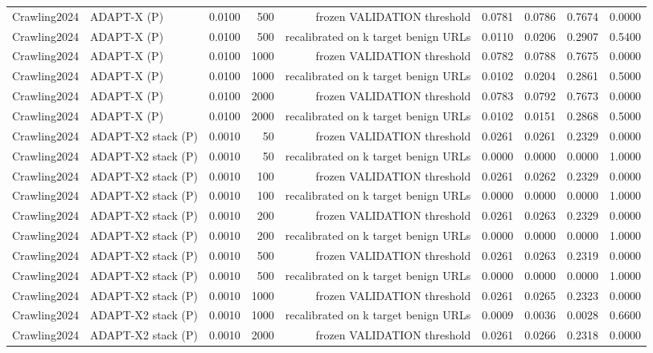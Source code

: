 \begin{table}[t]
\begin{tabular}{llrrrrrrr}
Crawling2024 & ADAPT-X (P) & 0.0100 & 500 & frozen VALIDATION threshold & 0.0781 & 0.0786 & 0.7674 & 0.0000 \\
Crawling2024 & ADAPT-X (P) & 0.0100 & 500 & recalibrated on k target benign URLs & 0.0110 & 0.0206 & 0.2907 & 0.5400 \\
Crawling2024 & ADAPT-X (P) & 0.0100 & 1000 & frozen VALIDATION threshold & 0.0782 & 0.0788 & 0.7675 & 0.0000 \\
Crawling2024 & ADAPT-X (P) & 0.0100 & 1000 & recalibrated on k target benign URLs & 0.0102 & 0.0204 & 0.2861 & 0.5000 \\
Crawling2024 & ADAPT-X (P) & 0.0100 & 2000 & frozen VALIDATION threshold & 0.0783 & 0.0792 & 0.7673 & 0.0000 \\
Crawling2024 & ADAPT-X (P) & 0.0100 & 2000 & recalibrated on k target benign URLs & 0.0102 & 0.0151 & 0.2868 & 0.5000 \\
Crawling2024 & ADAPT-X2 stack (P) & 0.0010 & 50 & frozen VALIDATION threshold & 0.0261 & 0.0261 & 0.2329 & 0.0000 \\
Crawling2024 & ADAPT-X2 stack (P) & 0.0010 & 50 & recalibrated on k target benign URLs & 0.0000 & 0.0000 & 0.0000 & 1.0000 \\
Crawling2024 & ADAPT-X2 stack (P) & 0.0010 & 100 & frozen VALIDATION threshold & 0.0261 & 0.0262 & 0.2329 & 0.0000 \\
Crawling2024 & ADAPT-X2 stack (P) & 0.0010 & 100 & recalibrated on k target benign URLs & 0.0000 & 0.0000 & 0.0000 & 1.0000 \\
Crawling2024 & ADAPT-X2 stack (P) & 0.0010 & 200 & frozen VALIDATION threshold & 0.0261 & 0.0263 & 0.2329 & 0.0000 \\
Crawling2024 & ADAPT-X2 stack (P) & 0.0010 & 200 & recalibrated on k target benign URLs & 0.0000 & 0.0000 & 0.0000 & 1.0000 \\
Crawling2024 & ADAPT-X2 stack (P) & 0.0010 & 500 & frozen VALIDATION threshold & 0.0261 & 0.0263 & 0.2319 & 0.0000 \\
Crawling2024 & ADAPT-X2 stack (P) & 0.0010 & 500 & recalibrated on k target benign URLs & 0.0000 & 0.0000 & 0.0000 & 1.0000 \\
Crawling2024 & ADAPT-X2 stack (P) & 0.0010 & 1000 & frozen VALIDATION threshold & 0.0261 & 0.0265 & 0.2323 & 0.0000 \\
Crawling2024 & ADAPT-X2 stack (P) & 0.0010 & 1000 & recalibrated on k target benign URLs & 0.0009 & 0.0036 & 0.0028 & 0.6600 \\
Crawling2024 & ADAPT-X2 stack (P) & 0.0010 & 2000 & frozen VALIDATION threshold & 0.0261 & 0.0266 & 0.2318 & 0.0000 \\

\end{tabular}
\end{table}
